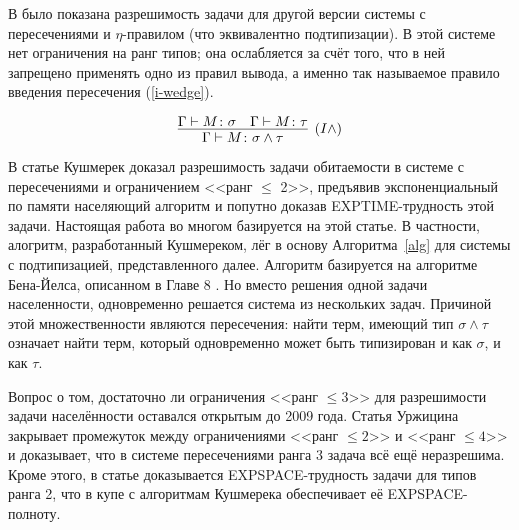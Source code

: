 \documentclass[../main.tex]{subfiles}
\begin{document}
В \cite{kurata_1995} было показана разрешимость задачи для другой версии системы с пересечениями и $\eta$-правилом (что эквивалентно подтипизации). В этой системе нет ограничения на ранг типов; она ослабляется за счёт того, что в ней запрещено применять одно из правил вывода, а именно так называемое правило введения пересечения (\ref{i-wedge}). 

\begin{equation} \label{i-wedge}
\infer[(I\wedge)]{\Gamma \vdash M \colon \sigma \wedge \tau}{\Gamma \vdash M \colon \sigma & \Gamma \vdash M \colon \tau}
\end{equation}

В статье \cite{kusmierek_2007} Кушмерек доказал разрешимость задачи обитаемости в системе с пересечениями и ограничением <<ранг $\leqslant$ 2>>, предъявив экспоненциальный по памяти населяющий алгоритм и попутно доказав EXPTIME-трудность этой задачи. Настоящая работа во многом базируется на этой статье. В частности, алогритм, разработанный Кушмереком, лёг в основу Алгоритма~\ref{alg} для системы с подтипизацией, представленного далее. Алгоритм базируется на алгоритме Бена-Йелса, описанном в Главе 8 \cite{hindley_2008}. Но вместо решения одной задачи населенности, одновременно решается система из нескольких задач. Причиной этой множественности являются пересечения: найти терм, имеющий тип $\sigma \wedge \tau$ означает найти терм, который одновременно может быть типизирован и как $\sigma$, и как $\tau$. 

Вопрос о том, достаточно ли ограничения <<ранг $\leqslant 3$>> для разрешимости задачи населённости оставался открытым до 2009 года. Статья Уржицина\cite{urzyczyn_2009} закрывает промежуток между ограничениями <<ранг $\leqslant 2$>> и <<ранг $\leqslant 4$>> и доказывает, что в системе пересечениями ранга $3$ задача всё ещё неразрешима. Кроме этого, в статье доказывается EXPSPACE-трудность задачи для типов ранга 2, что в купе с алгоритмам Кушмерека обеспечивает её EXPSPACE-полноту.


\end{document}
